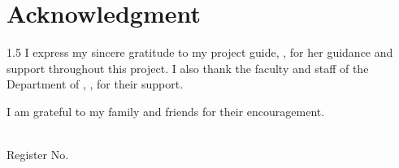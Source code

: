\chapter*{Acknowledgment}
\thispagestyle{plain}
\begin{spacing}{1.5}
I express my sincere gratitude to my project guide, \GuideName, for her guidance and support throughout this project. I also thank the faculty and staff of the Department of \DepartmentName, \CollegeName, for their support.

I am grateful to my family and friends for their encouragement.
\vspace{2cm}
\begin{flushright}\StudentName\\Register No. \RegisterNumber\end{flushright}
\end{spacing}
\clearpage
